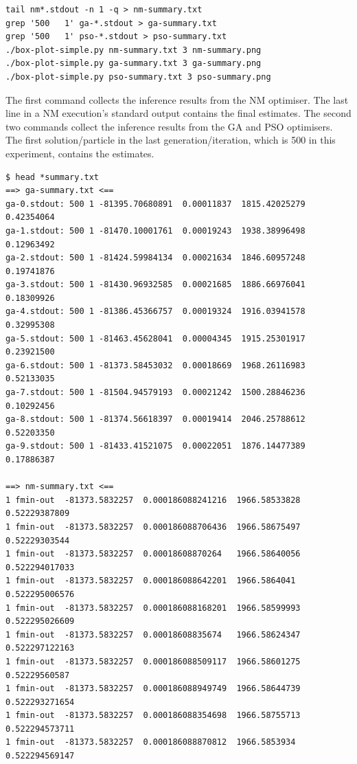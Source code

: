 \documentclass[graybox]{svmult}
\begin{document}
{\scriptsize{}\begin{verbatim}
tail nm*.stdout -n 1 -q > nm-summary.txt
grep '500   1' ga-*.stdout > ga-summary.txt
grep '500   1' pso-*.stdout > pso-summary.txt
./box-plot-simple.py nm-summary.txt 3 nm-summary.png
./box-plot-simple.py ga-summary.txt 3 ga-summary.png
./box-plot-simple.py pso-summary.txt 3 pso-summary.png
\end{verbatim}}

The first command collects the inference results from the NM optimiser.  The last line in a NM execution's standard output contains the final estimates.  The second two commands collect the inference results from the GA and PSO optimisers.  The first solution/particle in the last generation/iteration, which is 500 in this experiment, contains the estimates.

{\scriptsize{}\begin{verbatim}
$ head *summary.txt
==> ga-summary.txt <==
ga-0.stdout: 500 1 -81395.70680891  0.00011837  1815.42025279  0.42354064
ga-1.stdout: 500 1 -81470.10001761  0.00019243  1938.38996498  0.12963492
ga-2.stdout: 500 1 -81424.59984134  0.00021634  1846.60957248  0.19741876
ga-3.stdout: 500 1 -81430.96932585  0.00021685  1886.66976041  0.18309926
ga-4.stdout: 500 1 -81386.45366757  0.00019324  1916.03941578  0.32995308
ga-5.stdout: 500 1 -81463.45628041  0.00004345  1915.25301917  0.23921500
ga-6.stdout: 500 1 -81373.58453032  0.00018669  1968.26116983  0.52133035
ga-7.stdout: 500 1 -81504.94579193  0.00021242  1500.28846236  0.10292456
ga-8.stdout: 500 1 -81374.56618397  0.00019414  2046.25788612  0.52203350
ga-9.stdout: 500 1 -81433.41521075  0.00022051  1876.14477389  0.17886387

==> nm-summary.txt <==
1 fmin-out  -81373.5832257  0.000186088241216  1966.58533828  0.52229387809
1 fmin-out  -81373.5832257  0.000186088706436  1966.58675497  0.52229303544
1 fmin-out  -81373.5832257  0.00018608870264   1966.58640056  0.522294017033
1 fmin-out  -81373.5832257  0.000186088642201  1966.5864041   0.522295006576
1 fmin-out  -81373.5832257  0.000186088168201  1966.58599993  0.522295026609
1 fmin-out  -81373.5832257  0.00018608835674   1966.58624347  0.522297122163
1 fmin-out  -81373.5832257  0.000186088509117  1966.58601275  0.52229560587
1 fmin-out  -81373.5832257  0.000186088949749  1966.58644739  0.522293271654
1 fmin-out  -81373.5832257  0.000186088354698  1966.58755713  0.522294573711
1 fmin-out  -81373.5832257  0.000186088870812  1966.5853934   0.522294569147


\end{verbatim}}
\end{document}
